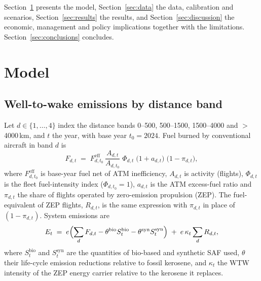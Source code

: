 \documentclass[preprint, 12pt, authoryear]{elsarticle}
\begin{document}
Section~\ref{sec:model} presents the model, Section~\ref{sec:data} the data,
calibration and scenarios, Section~\ref{sec:results} the results, and
Section~\ref{sec:discussion} the economic, management and policy implications
together with the limitations. Section~\ref{sec:conclusions} concludes.

\section{Model}
\label{sec:model}

\subsection{Well-to-wake emissions by distance band}

Let $d\in\{1,\dots,4\}$ index the distance bands 0--500, 500--1500, 1500--4000
and $>$4000\,km, and $t$ the year, with base year $t_0=2024$. Fuel burned by
conventional aircraft in band $d$ is
\begin{equation}
\label{eq:fuel}
F_{d,t} \;=\; F^{\mathrm{eff}}_{d,t_0}\,\frac{A_{d,t}}{A_{d,t_0}}\;
\Phi_{d,t}\;\bigl(1+a_{d,t}\bigr)\;\bigl(1-\pi_{d,t}\bigr),
\end{equation}
where $F^{\mathrm{eff}}_{d,t_0}$ is base-year fuel net of ATM inefficiency,
$A_{d,t}$ is activity (flights), $\Phi_{d,t}$ is the fleet fuel-intensity index
($\Phi_{d,t_0}=1$), $a_{d,t}$ is the ATM excess-fuel ratio and $\pi_{d,t}$ the
share of flights operated by zero-emission propulsion (ZEP). The fuel-equivalent
of ZEP flights, $R_{d,t}$, is the same expression with $\pi_{d,t}$ in place of
$(1-\pi_{d,t})$. System emissions are
\begin{equation}
\label{eq:emis}
E_t \;=\; e\Bigl(\sum_d F_{d,t} - \theta^{\mathrm{bio}} S^{\mathrm{bio}}_t
- \theta^{\mathrm{syn}} S^{\mathrm{syn}}_t\Bigr) \;+\; e\,\kappa_t\sum_d R_{d,t},
\end{equation}
where $S^{\mathrm{bio}}_t$ and $S^{\mathrm{syn}}_t$ are the quantities of
bio-based and synthetic SAF used, $\theta$ their life-cycle emission reductions
relative to fossil kerosene, and $\kappa_t$ the WTW intensity of the ZEP energy
carrier relative to the kerosene it replaces.
\end{document}
